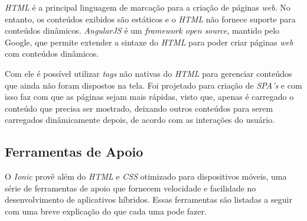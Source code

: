 \textit{HTML} é a principal linguagem de marcação para a criação de páginas \textit{web}. No entanto, os conteúdos exibidos são estáticos e o \textit{HTML} não fornece suporte para conteúdos dinâmicos.
\textit{AngularJS} é um \textit{framework open source}, mantido pelo Google, que permite extender a sintaxe do \textit{HTML} para poder criar páginas \textit{web} com conteúdos dinâmicos.


Com ele é possível utilizar \textit{tags} não nativas do \textit{HTML} para gerenciar conteúdos que ainda não foram dispostos na tela. 
Foi projetado para criação de \textit{SPA's} e com isso faz com que as páginas sejam mais rápidas, visto que, apenas é carregado o conteúdo que precisa ser mostrado, 
deixando outros conteúdos para serem carregados dinâmicamente depois, de acordo com as interações do usuário.    

\subsection{Ferramentas de Apoio} \label{subsec:ferramentasapoio}

O \textit{Ionic} provê além do \textit{HTML} e \textit{CSS} otimizado para dispositivos móveis, uma série de ferramentas de 
apoio que fornecem velocidade e facilidade no desenvolvimento de aplicativos híbridos. Essas ferramentas são listadas a seguir 
com uma breve explicação do que cada uma pode fazer.

